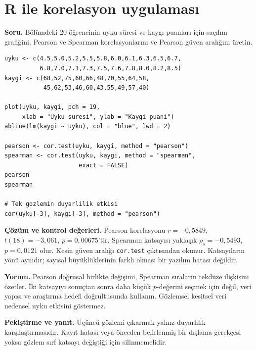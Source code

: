 \section{R ile korelasyon uygulaması}
\label{sec:r-correlation}

\textbf{Soru.} Bölümdeki 20 öğrencinin uyku süresi ve kaygı puanları için
saçılım grafiğini, Pearson ve Spearman korelasyonlarını ve Pearson güven
aralığını üretin.

\begin{lstlisting}[style=prismR]
uyku <- c(4.5,5.0,5.2,5.5,5.8,6.0,6.1,6.3,6.5,6.7,
          6.8,7.0,7.1,7.3,7.5,7.6,7.8,8.0,8.2,8.5)
kaygi <- c(68,52,75,60,66,48,70,55,64,58,
           45,62,53,46,60,43,55,49,57,40)

plot(uyku, kaygi, pch = 19,
     xlab = "Uyku suresi", ylab = "Kaygi puani")
abline(lm(kaygi ~ uyku), col = "blue", lwd = 2)

pearson <- cor.test(uyku, kaygi, method = "pearson")
spearman <- cor.test(uyku, kaygi, method = "spearman",
                     exact = FALSE)
pearson
spearman

# Tek gozlemin duyarlilik etkisi
cor(uyku[-3], kaygi[-3], method = "pearson")
\end{lstlisting}

\begin{outputguidebox}
\textbf{Çözüm ve kontrol değerleri.} Pearson korelasyonu
$r=-0{,}5849$, $t(18)=-3{,}061$, $p=0{,}00675$'tir. Spearman katsayısı
yaklaşık $\rho_s=-0{,}5493$, $p=0{,}0121$ olur. Kesin güven aralığı
\texttt{cor.test} çıktısından okunur. Katsayıların yönü aynıdır; sayısal
büyüklüklerinin farklı olması bir yazılım hatası değildir.
\end{outputguidebox}

\textbf{Yorum.} Pearson doğrusal birlikte değişimi, Spearman sıraların tekdüze
ilişkisini özetler. İki katsayıyı sonuçtan sonra daha küçük $p$-değerini seçmek
için değil, veri yapısı ve araştırma hedefi doğrultusunda kullanın. Gözlemsel
kesitsel veri nedensel uyku etkisini göstermez.

\textbf{Pekiştirme ve yanıt.} Üçüncü gözlemi çıkarmak yalnız duyarlılık
karşılaştırmasıdır. Kayıt hatası veya önceden belirlenmiş bir dışlama gerekçesi
yoksa gözlem sırf katsayı değiştiği için silinmemelidir.